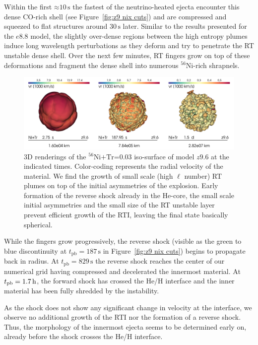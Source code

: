 \documentclass[fleqn,usenatbib]{mnras}
\newcommand{\tpb}{\ensuremath{t_{\text{pb}}}}
\newcommand{\nickel}{\ensuremath{\mathrm{^{56}Ni}}\xspace}
\newcommand{\tracer}{\ensuremath{\mathrm{Tr}}\xspace}
\newcommand{\s}{\ensuremath{\text{s}}}
\begin{document}
Within the first $\mathord{\approx}10\,\s$ the fastest of the 
neutrino-heated ejecta encounter this dense CO-rich shell (see Figure~\ref{fig:z9 nix cuts})
and are compressed and squeezed to flat structures around $30\,\s$ later.
Similar to the results presented for the $e8.8$ model, the slightly over-dense regions between the high 
entropy plumes induce long wavelength perturbations as they deform and 
try to penetrate the RT unstable dense shell. 
Over the next few minutes, RT fingers grow on top of these deformations and fragment the 
dense shell into numerous \nickel-rich shrapnels.

\begin{figure}%
\includegraphics[width=\textwidth]{pic/z9_tile_1_3.png}
    \caption{3D renderings of the $\nickel\mathord{+}\tracer\mathord{=}0.03$ 
             iso-surface of model $z9.6$ at the indicated times.  Color-coding represents the radial velocity of the material. We find the growth of small scale (high $\ell$ number) RT plumes on top of the initial asymmetries of the explosion. Early formation of the reverse shock already in the He-core, the small scale initial asymmetries and the small size of the RT unstable layer prevent efficient growth of the RTI, leaving the final state basically spherical. }
\label{fig:z9 3d rendering}
\end{figure}%
While the fingers grow progressively, the reverse shock (visible as the green to blue discontinuity 
at $\tpb=187\,\s$ in Figure~\ref{fig:z9 nix cuts}) begins to propagate back in radius. 
At $\tpb=829\,\s$ the reverse shock reaches the center of our numerical grid having 
compressed and decelerated the innermost material. 
At $\tpb=1.7\,\rm h$, the forward shock has crossed the He/H interface and the inner 
material has been fully shredded by the instability.

As the shock does not show any significant change in velocity at the interface, we observe 
no additional growth of the RTI nor the formation of a reverse shock.
Thus, the morphology of the innermost ejecta seems to be determined early on, already 
before the shock crosses the He/H interface.
\end{document}
